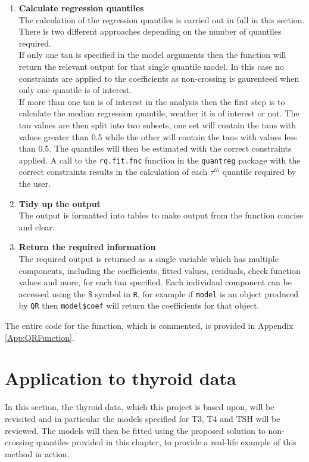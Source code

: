 \documentclass[12pt,a4paper]{report}
\begin{document}
\begin{enumerate}[1)]
    \item \textbf{Calculate regression quantiles}
    \\ The calculation of the regression quantiles is carried out in full in this section. There is two different approaches depending on the number of quantiles required.
    \\If only one tau is specified in the model arguments then the function will return the relevant output for that single quantile model. In this case no constraints are applied to the coefficients as non-crossing is gaurenteed when only one quantile is of interest.
    \\If more than one tau is of interest in the analysis then the first step is to calculate the median regression quantile, weather it is of interest or not. The tau values are then split into two subsets, one set will contain the taus with values greater than 0.5 while the other will contain the taus with values less than 0.5. The quantiles will then be estimated with the correct constraints applied. A call to the {\small{\verb"rq.fit.fnc"}} function in the {\small{\verb"quantreg"}} package with the correct constraints results in the calculation of each $\tau^{th}$ quantile required by the user.
    \item \textbf{Tidy up the output}
    \\ The output is formatted into tables to make output from the function concise and clear.
    \item \textbf{Return the required information}
    \\ The required output is returned as a single variable which has multiple components, including the coefficients, fitted values, residuals, check function values and more, for each tau specified. Each individaul component can be accessed using the \$ symbol in {\small{\verb"R"}}, for example if {\small{\verb"model"}} is an object produced by {\small{\verb"QR"}} then {\small{\verb"model$coef"}} will return the coefficients for that object.
\end{enumerate}
\vspace{2mm}

\par\noindent
The entire code for the function, which is commented, is provided in Appendix \ref{App:QRFunction}.
\section{Application to thyroid data}
In this section, the thyroid data, which this project is based upon, will be revisited and in particular the models specified for T3, T4 and TSH will be reviewed. The models will then be fitted using the proposed solution to non-crossing quantiles provided in this chapter, to provide a real-life example of this method in action.
\vspace{2mm}
\end{document}
